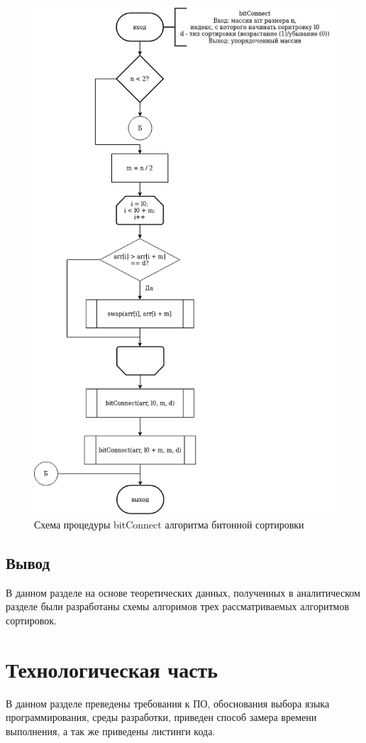 \documentclass[12pt]{report}
\begin{document}
	\begin{figure}[H]
		\centering
		\includegraphics[width=0.7\linewidth]{bitonic_3}
		\caption{Схема процедуры bitConnect алгоритма битонной сортировки}
		\label{fig:schema_insertion}
	\end{figure}
	
	\section{Вывод}
	
	В данном разделе на основе теоретических данных, полученных в аналитическом разделе были разработаны схемы алгоримов трех рассматриваемых алгоритмов сортировок.
	
	\chapter{Технологическая часть}
	
	В данном разделе преведены требования к ПО, обоснования выбора языка программирования, среды разработки, приведен способ замера времени выполнения, а так же приведены листинги кода.
	
\end{document}
